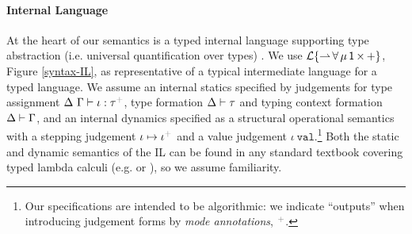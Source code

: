 \documentclass[pldi]{sigplanconf-pldi15}
\newcommand{\moutput}{^{\color{gray}+}}
\begin{document}
\paragraph{Internal Language} 
At the heart of our semantics is a typed internal language supporting type abstraction (i.e. universal quantification over types) \cite{Reynolds94anintroduction}. We use {$\mathcal{L}\{{\rightharpoonup}\,{\forall}\,{\mu}\,{{\sf 1}}\,{\times}\,{+}\}$}, Figure \ref{syntax-IL}, as representative of a typical intermediate language for a typed language. %
We assume an internal statics specified by judgements for type assignment {$\iDelta~\iGamma \vdash \iota : \tau\moutput$}, type formation {$\Delta \vdash \tau$} and typing context formation { $\Delta \vdash \Gamma$}, and an 
internal dynamics specified as a structural operational semantics with a stepping judgement {\small $\iota \mapsto \iota\moutput$} and a value judgement {$\iota~\mathtt{val}$}.\footnote{Our specifications are intended to be algorithmic: we indicate ``outputs'' when introducing judgement forms by \emph{mode annotations}, $\moutput$.} Both the static and dynamic semantics of the IL can be found in any standard textbook covering typed lambda calculi (e.g. \cite{pfpl} or \cite{tapl}), so we assume familiarity.
\end{document}
